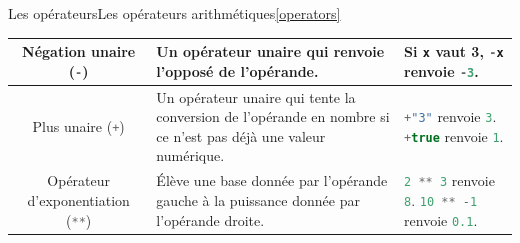 \documentclass{beamer}
\begin{document}
\begin{frame}{Les opérateurs}{Les opérateurs arithmétiques\cref{operators}}
\begin{tiny}
\begin{table}[h!]
\begin{tabular}{|c|p{4cm}|p{4cm}|}
                \hline
                Négation unaire (\lstinline[language=Javascript]!-!)             & Un opérateur unaire qui renvoie l'opposé de l'opérande.                                                                                                                                                                                                                                                                             & Si \lstinline[language=Javascript]!x! vaut 3, \lstinline[language=Javascript]!-x! renvoie \lstinline[language=Javascript]!-3!.                                                                                                                                                                                                                                                                                                                                    \\
                \hline
                Plus unaire (\lstinline[language=Javascript]!+!)                 & Un opérateur unaire qui tente la conversion de l'opérande en nombre si ce n'est pas déjà une valeur numérique.                                                                                                                                                                                                                      & \lstinline[language=Javascript]!+"3"! renvoie \lstinline[language=Javascript]!3!. \newline \lstinline[language=Javascript]!+true! renvoie \lstinline[language=Javascript]!1!.                                                                                                                                                                                                                                                                                     \\
                \hline
                Opérateur d'exponentiation (\lstinline[language=Javascript]!**!) & Élève une base donnée par l'opérande gauche à la puissance donnée par l'opérande droite.                                                                                                                                                                                                                                            & \lstinline[language=Javascript]!2 ** 3! renvoie \lstinline[language=Javascript]!8!. \newline \lstinline[language=Javascript]!10 ** -1! renvoie \lstinline[language=Javascript]!0.1!.                                                                                                                                                                                                                                                                              \\
                \hline
            \end{tabular}
        \end{table}
    \end{tiny}
\end{frame}
\end{document}
